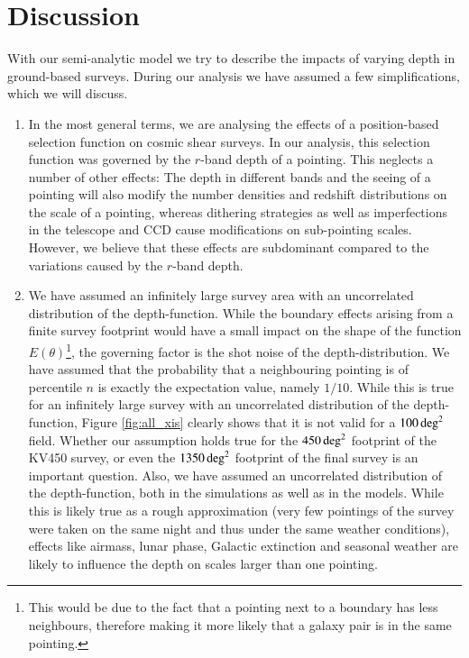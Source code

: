 \section{Discussion}
\label{sec:discussion}
With our semi-analytic model we try to describe the impacts of varying depth in ground-based surveys. During our analysis we have assumed a few simplifications, which we will discuss.
\begin{enumerate}
\item In the most general terms, we are analysing the effects of a position-based selection function on cosmic shear surveys. In our analysis, this selection function was governed by the $r$-band depth of a pointing. This neglects a number of other effects: The depth in different bands and the seeing of a pointing will also modify the number densities and redshift distributions on the scale of a pointing, whereas dithering strategies as well as imperfections in the telescope and CCD cause modifications on sub-pointing scales. However, we believe that these effects are subdominant compared to the variations caused by the $r$-band depth.

\item We have assumed an infinitely large survey area with an uncorrelated distribution of the depth-function. While the boundary effects arising from a finite survey footprint would have a small impact on the shape of the function $E(\theta)$\footnote{This would be due to the fact that a pointing next to a boundary has less neighbours, therefore making it more likely that a galaxy pair is in the same pointing.}, the governing factor is the shot noise of the depth-distribution. We have assumed that the probability that a neighbouring pointing is of percentile $n$ is exactly the expectation value, namely $1/10$. While this is true for an infinitely large survey with an uncorrelated distribution of the depth-function, Figure \ref{fig:all_xis} clearly shows that it is not valid for a $100\,\rm{deg}^2$ field. Whether our assumption holds true for the $450\,\rm{deg}^2$ footprint of the KV450 survey, or even the $1350\,\rm{deg}^2$ footprint of the final survey is an important question. Also, we have assumed an uncorrelated distribution of the depth-function, both in the simulations as well as in the models. While this is likely true as a rough approximation (very few pointings of the survey were taken on the same night and thus under the same weather conditions), effects like airmass, lunar phase, Galactic extinction and seasonal weather are likely to influence the depth on scales larger than one pointing.


\end{enumerate}
